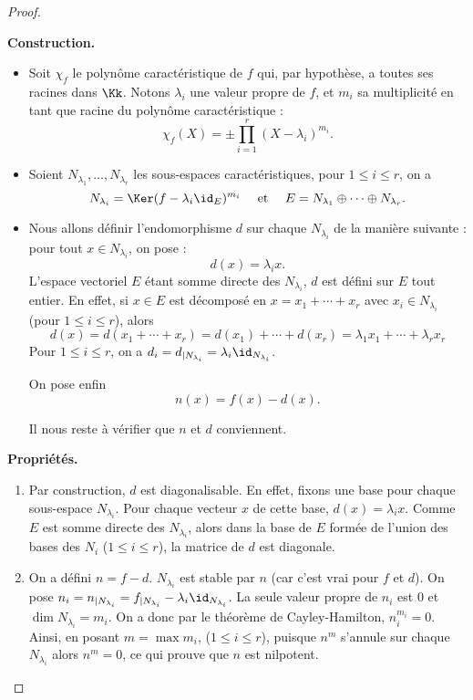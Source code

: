 \documentclass[12pt, class=report,crop=false]{standalone}
\begin{document}
\begin{proof}~

\textbf{Construction.}
\begin{itemize}
  \item Soit $\chi_f$ le polynôme caractéristique de $f$ qui, par hypothèse, a toutes ses racines dans $\Kk$.
 Notons $\lambda_i$ une valeur propre de $f$, et $m_i$ sa multiplicité en tant que racine du polynôme caractéristique :
$$\chi_f(X)=\pm\prod_{i=1}^r(X-\lambda_i)^{m_i}.$$

  \item Soient $N_{\lambda_1},\ldots, N_{\lambda_r}$ les sous-espaces caractéristiques, pour $1\le i\le r$, on a 
$$N_{\lambda_i} = \Ker(f-\lambda_i\id_E)^{m_i}\quad  \text{ et }\quad 
E=N_{\lambda_1}\oplus\cdots\oplus N_{\lambda_r}.$$

  \item Nous allons définir l'endomorphisme $d$ sur chaque $N_{\lambda_i}$ de la manière suivante : pour tout $x\in N_{\lambda_i}$, on pose :
$$d(x)=\lambda_i x.$$
L'espace vectoriel $E$ étant somme directe des $N_{\lambda_i}$, 
$d$ est défini sur $E$ tout entier. En effet, si $x \in E$ est décomposé en
 $x=x_1+\cdots+x_r$ avec $x_i\in N_{\lambda_i}$ (pour $1\le i\le r$), alors
 $$d(x) = d(x_1+\cdots+x_r) = d(x_1) + \cdots + d(x_r)
 = \lambda_1 x_1 + \cdots + \lambda_r x_r$$
Pour $1\le i\le r$, on a  $d_i=d_{|N_{\lambda_i}}=\lambda_i\id_{N_{\lambda_i}}$. 

On pose enfin 
$$n(x)=f(x)-d(x).$$

Il nous reste à vérifier que $n$ et $d$ conviennent.
\end{itemize}

\medskip

\textbf{Propriétés.}
\begin{enumerate}
  \item Par construction, $d$ est diagonalisable. 
  En effet, fixons une base pour chaque sous-espace $N_{\lambda_i}$. Pour chaque vecteur $x$ de cette base,
  $d(x)=\lambda_i x$. Comme $E$ est somme directe des  $N_{\lambda_i}$, 
  alors dans la base de $E$ formée de l'union des bases des $N_i$ ($1\le i\le r$), la matrice de $d$ est diagonale.

  \item On a défini $n=f-d$. $N_{\lambda_i}$ est stable par $n$ (car c'est vrai pour $f$  et $d$). 
  On pose $n_i=n_{|N_{\lambda_i}}=f_{|N_{\lambda_i}}-\lambda_i\id_{N_{\lambda_i}}$. La seule valeur propre de $n_i$ est $0$ et $\dim N_{\lambda_i} = m_i$. On a donc par le théorème de Cayley-Hamilton, $n_i^{m_i}=0$. Ainsi, en posant $m=\max {m_i}$, ($1\le i \le r$), puisque $n^m$ s'annule sur chaque $N_{\lambda_i}$ alors $n^m=0$, ce qui prouve que $n$ est nilpotent.


\end{enumerate}
\end{proof}
\end{document}
